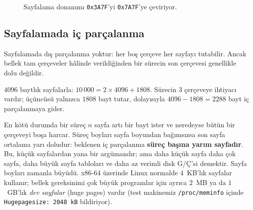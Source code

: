 \documentclass[11pt,a4paper]{article}
\begin{document}
\begin{figure}[H]
\centering
{}
\caption{Sayfalama donanımı \texttt{0x3A7F}'yi \texttt{0x7A7F}'ye çeviriyor.}
\end{figure}

\subsection{Sayfalamada iç parçalanma}

Sayfalamada dış parçalanma yoktur: her boş çerçeve her sayfayı tutabilir. Ancak bellek tam çerçeveler hâlinde verildiğinden bir sürecin son çerçevesi genellikle dolu değildir.

\begin{example}
$4096$ baytlık sayfalarla: $10\,000 = 2 \times 4096 + 1808$. Sürecin $3$ çerçeveye ihtiyacı vardır; üçüncüsü yalnızca $1808$ bayt tutar, dolayısıyla $4096 - 1808 = 2288$ bayt iç parçalanmaya gider.
\end{example}

En kötü durumda bir süreç $n$ sayfa artı bir bayt ister ve neredeyse bütün bir çerçeveyi boşa harcar. Süreç boyları sayfa boyundan bağımsızsa son sayfa ortalama yarı doludur: beklenen iç parçalanma \textbf{süreç başına yarım sayfadır}. Bu, küçük sayfalardan yana bir argümandır; ama daha küçük sayfa daha çok sayfa, daha büyük sayfa tabloları ve daha az verimli disk G/Ç'si demektir. Sayfa boyları zamanla büyüdü. x86-64 üzerinde Linux normalde $4$~KB'lık sayfalar kullanır; bellek gereksinimi çok büyük programlar için ayrıca $2$~MB ya da $1$~GB'lık \emph{dev sayfalar} (huge pages) vardır (test makinemiz \texttt{/proc/meminfo} içinde \texttt{Hugepagesize: 2048 kB} bildiriyor).
\end{document}

